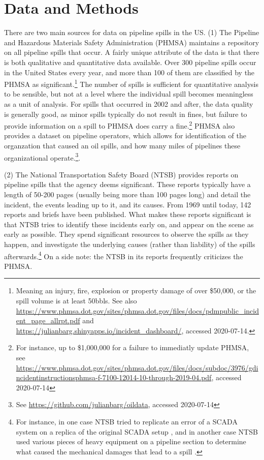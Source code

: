 \section{Data and Methods}

There are two main sources for data on pipeline spills in the US. (1) The Pipeline and Hazardous Materials Safety Administration (PHMSA) maintains a repository on all pipeline spills that occur. A fairly unique attribute of the data is that there is both qualitative and quantitative data available. Over 300 pipeline spills occur in the United States every year, and more than 100 of them are classified by the PHMSA as significant.\footnote{Meaning an injury, fire, explosion or property damage of over \$50,000, or the spill volume is at least 50bbls. See also \url{https://www.phmsa.dot.gov/sites/phmsa.dot.gov/files/docs/pdmpublic_incident_page_allrpt.pdf} and \url{https://julianbarg.shinyapps.io/incident_dashboard/}, accessed 2020-07-14.} The number of spills is sufficient for quantitative analysis to be sensible, but not at a level where the individual spill becomes meaningless as a unit of analysis. For spills that occurred in 2002 and after, the data quality is generally good, as minor spills typically do not result in fines, but failure to provide information on a spill to PHMSA does carry a fine.\footnote{For instance, up to \$1,000,000 for a failure to immediatly update PHMSA, see \url{https://www.phmsa.dot.gov/sites/phmsa.dot.gov/files/docs/subdoc/3976/gdincidentinstructionsphmsa-f-7100-12014-10-through-2019-04.pdf}, accessed 2020-07-14} PHMSA also provides a dataset on pipeline operators, which allows for identification of the organzation that caused an oil spills, and how many miles of pipelines these organizational operate.\footnote{See \url{https://github.com/julianbarg/oildata}, accessed 2020-07-14}.

(2) The National Transportation Safety Board (NTSB) provides reports on pipeline spills that the agency deems significant. These reports typically have a length of 50-200 pages (usually being more than 100 pages long) and detail the incident, the events leading up to it, and its causes. From 1969 until today, 142 reports and briefs have been published. What makes these reports significant is that NTSB tries to identify these incidents early on, and appear on the scene as early as possible. They spend significant resources to observe the spills as they happen, and investigate the underlying causes (rather than liability) of the spills afterwards.\footnote{For instance, in one case NTSB tried to replicate an error of a SCADA system on a replica of the original SCADA setup \citep{NTSB2002}, and in another case NTSB used various pieces of heavy equipment on a pipeline section to determine what caused the mechanical damages that lead to a spill \citep{NTSB1990}.} On a side note: the NTSB in its reports frequently criticizes the PHMSA.

